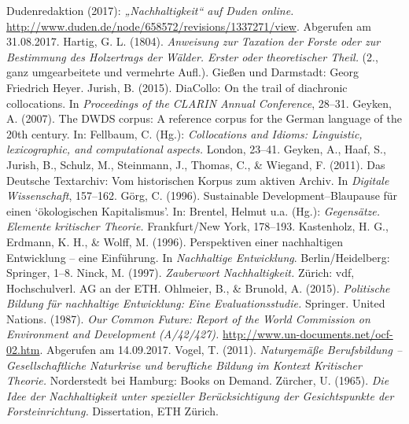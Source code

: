 \documentclass[
    german,
    a4paper,%
    12pt,%
    oneside,%
    toc=bibliography,
    final,
]{scrartcl}
\begin{document}
\newpage
\begin{thebibliography}{9}

 Dudenredaktion (2017): \textit{„Nach­hal­tig­keit“ auf Duden online.} \url{http://www.duden.de/node/658572/revisions/1337271/view}. Abgerufen am 31.08.2017.
 Hartig, G. L. (1804). \textit{Anweisung zur Taxation der Forste oder zur Bestimmung des Holzertrags der Wälder. Erster oder theoretischer Theil.} (2., ganz umgearbeitete und vermehrte Aufl.). Gießen und Darmstadt: Georg Friedrich Heyer.
 Jurish, B. (2015). DiaCollo: On the trail of diachronic collocations. In \textit{Proceedings of the CLARIN Annual Conference}, 28–31.
 Geyken, A. (2007). The DWDS corpus: A reference corpus for the German language of the 20th century. In: Fellbaum, C. (Hg.): \textit{Collocations and Idioms: Linguistic, lexicographic, and computational aspects.} London, 23–41.
 Geyken, A., Haaf, S., Jurish, B., Schulz, M., Steinmann, J., Thomas, C., \& Wiegand, F. (2011). Das Deutsche Textarchiv: Vom historischen Korpus zum aktiven Archiv. In \textit{Digitale Wissenschaft}, 157–162.
 Görg, C. (1996). Sustainable Development–Blaupause für einen ‘ökologischen Kapitalismus’. In: Brentel, Helmut u.a. (Hg.): \textit{Gegensätze. Elemente kritischer Theorie.} Frankfurt/New York, 178–193.
 Kastenholz, H. G., Erdmann, K. H., \& Wolff, M. (1996). Perspektiven einer nachhaltigen Entwicklung – eine Einführung. In \textit{Nachhaltige Entwicklung}. Berlin/Heidelberg: Springer, 1–8.
 Ninck, M. (1997). \textit{Zauberwort Nachhaltigkeit.} Zürich: vdf, Hochschulverl. AG an der ETH.
 Ohlmeier, B., \& Brunold, A. (2015). \textit{Politische Bildung für nachhaltige Entwicklung: Eine Evaluationsstudie.} Springer.
 United Nations. (1987). \textit{Our Common Future: Report of the World Commission on Environment and Development (A/42/427).} \url{http://www.un-documents.net/ocf-02.htm}. Abgerufen am 14.09.2017.
 Vogel, T. (2011). \textit{Naturgemäße Berufsbildung – Gesellschaftliche Naturkrise und berufliche Bildung im Kontext Kritischer Theorie.} Norderstedt bei Hamburg: Books on Demand.
 Zürcher, U. (1965). \textit{Die Idee der Nachhaltigkeit unter spezieller Berücksichtigung der Gesichtspunkte der Forsteinrichtung.} Dissertation, ETH Zürich.

\end{thebibliography}
\end{document}

